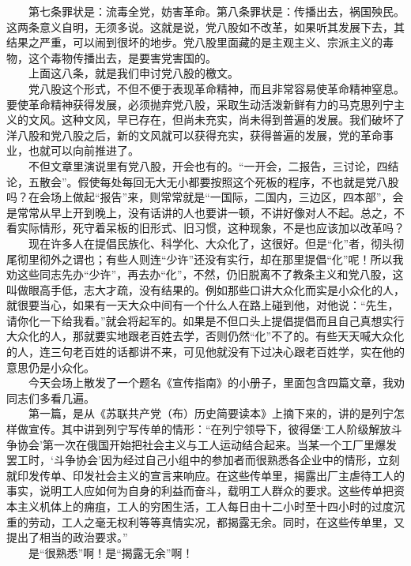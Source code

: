 \documentclass[cn,11pt,chinese]{elegantbook}
\begin{document}
　　第七条罪状是：流毒全党，妨害革命。第八条罪状是：传播出去，祸国殃民。这两条意义自明，无须多说。这就是说，党八股如不改革，如果听其发展下去，其结果之严重，可以闹到很坏的地步。党八股里面藏的是主观主义、宗派主义的毒物，这个毒物传播出去，是要害党害国的。\\
　　上面这八条，就是我们申讨党八股的檄文。\\
　　党八股这个形式，不但不便于表现革命精神，而且非常容易使革命精神窒息。要使革命精神获得发展，必须抛弃党八股，采取生动活泼新鲜有力的马克思列宁主义的文风。这种文风，早已存在，但尚未充实，尚未得到普遍的发展。我们破坏了洋八股和党八股之后，新的文风就可以获得充实，获得普遍的发展，党的革命事业，也就可以向前推进了。\\
　　不但文章里演说里有党八股，开会也有的。“一开会，二报告，三讨论，四结论，五散会”。假使每处每回无大无小都要按照这个死板的程序，不也就是党八股吗？在会场上做起“报告”来，则常常就是“一国际，二国内，三边区，四本部”，会是常常从早上开到晚上，没有话讲的人也要讲一顿，不讲好像对人不起。总之，不看实际情形，死守着呆板的旧形式、旧习惯，这种现象，不是也应该加以改革吗？\\
　　现在许多人在提倡民族化、科学化、大众化了，这很好。但是“化”者，彻头彻尾彻里彻外之谓也；有些人则连“少许”还没有实行，却在那里提倡“化”呢！所以我劝这些同志先办“少许”，再去办“化”，不然，仍旧脱离不了教条主义和党八股，这叫做眼高手低，志大才疏，没有结果的。例如那些口讲大众化而实是小众化的人，就很要当心，如果有一天大众中间有一个什么人在路上碰到他，对他说：“先生，请你化一下给我看。”就会将起军的。如果是不但口头上提倡提倡而且自己真想实行大众化的人，那就要实地跟老百姓去学，否则仍然“化”不了的。有些天天喊大众化的人，连三句老百姓的话都讲不来，可见他就没有下过决心跟老百姓学，实在他的意思仍是小众化。\\
　　今天会场上散发了一个题名《宣传指南》的小册子，里面包含四篇文章，我劝同志们多看几遍。\\
　　第一篇，是从《苏联共产党（布）历史简要读本》上摘下来的，讲的是列宁怎样做宣传。其中讲到列宁写传单的情形：“在列宁领导下，彼得堡‘工人阶级解放斗争协会’第一次在俄国开始把社会主义与工人运动结合起来。当某一个工厂里爆发罢工时，‘斗争协会’因为经过自己小组中的参加者而很熟悉各企业中的情形，立刻就印发传单、印发社会主义的宣言来响应。在这些传单里，揭露出厂主虐待工人的事实，说明工人应如何为自身的利益而奋斗，载明工人群众的要求。这些传单把资本主义机体上的痈疽，工人的穷困生活，工人每日由十二小时至十四小时的过度沉重的劳动，工人之毫无权利等等真情实况，都揭露无余。同时，在这些传单里，又提出了相当的政治要求。”\\
　　是“很熟悉”啊！是“揭露无余”啊！\\
\end{document}
